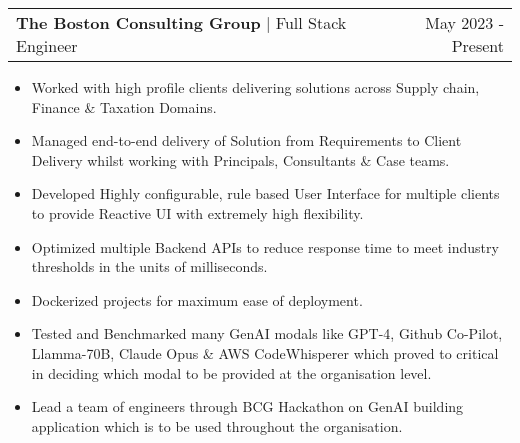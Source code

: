 \documentclass[a4paper,12pt]{article}
\makeatletter
\newenvironment{jobshort}[2]
    {
    \begin{tabularx}{\linewidth}{@{}l X r@{}}
    \textbf{#1} & \hfill &  #2 \\[3.75pt]
    \end{tabularx}
    }
    {
    }
\newenvironment{joblong}[3]
    {
    \begin{tabularx}{\linewidth}{@{}l X r@{}}
    \textbf{#1} | #2 & \hfill &  #3 \\[3.75pt]
    \end{tabularx}
    \begin{minipage}[t]{\linewidth}
    \begin{itemize}[nosep,after=\strut, leftmargin=1em, itemsep=3pt,label=-]
    }
    {
    \end{itemize}
    \end{minipage}    
    }
\makeatother
\begin{document}


\begin{joblong}{The Boston Consulting Group}{Full Stack Engineer}{May 2023 - Present}

\item Worked with high profile clients delivering solutions across Supply chain, Finance \& Taxation Domains.
\item Managed end-to-end delivery of Solution from Requirements to Client Delivery whilst working with Principals, Consultants \& Case teams.
\item Developed Highly configurable, rule based User Interface for multiple clients to provide Reactive UI with extremely high flexibility.
\item Optimized multiple Backend APIs to reduce response time to meet industry thresholds in the units of milliseconds.
\item Dockerized projects for maximum ease of deployment.
\item Tested and Benchmarked many GenAI modals like GPT-4, Github Co-Pilot, Llamma-70B, Claude Opus \& AWS CodeWhisperer which proved to critical in deciding which modal to be provided at the organisation level.
\item Lead a team of engineers through BCG Hackathon on GenAI building application which is to be used throughout the organisation.

\end{joblong}
\end{document}
